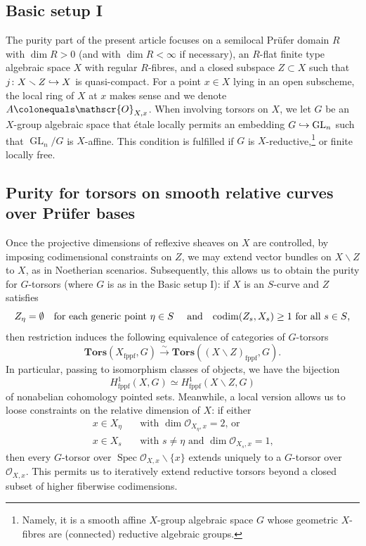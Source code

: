 \documentclass[JEP,XML,SOM,Unicode,published]{cedram}
\newcommand\hto{\mathrel{\lhook\joinrel\to}}
\let\backslash\smallsetminus
\newcommand{\sO}{\mathscr{O}}
\let\hra\hto
\let\ce\colonequals
\let\q\quad
\newcommand{\isoto}{\overset{\sim}{\longrightarrow}}
\newcommand{\fppf}{\mathrm{fppf}}
\DeclareMathOperator{\Spec}{Spec}
\DeclareMathOperator{\GL}{GL}
\DeclareMathOperator{\codim}{codim}
\theoremstyle{plain}
\theoremstyle{definition}
\begin{document}
\subsection{Basic setup I}\label{intro-setup}
The purity part of the present article focuses on a semilocal Prüfer domain $R$ with $\dim R>0$ (and with $\dim R<\infty$ if necessary), an $R$-flat finite type algebraic space $X$ with regular $R$-fibres, and a closed subspace $Z\subset X$ such that $j\colon X\backslash Z\hra X$ is quasi-compact.
For a point $x\in X$ lying in an open subscheme, the local ring of $X$ at $x$ makes sense and we denote $A\ce \sO_{X,x}$.
When involving torsors on $X$, we let $G$ be an $X$-group algebraic space that étale locally permits an embedding $G\hra \GL_n$ such that $\GL_n/G$ is $X$-affine.
This condition is fulfilled if $G$ is $X$-reductive,\footnote{Namely, it is a smooth affine $X$-group algebraic space $G$ whose geometric $X$-fibres are (connected) reductive algebraic groups.} or finite locally free.

\subsection{Purity for torsors on smooth relative curves over Prüfer bases}\label{par-Purity for torsors on smooth relative curves over Prüfer bases}
Once the projective dimensions of reflexive sheaves on $X$ are controlled, by imposing codimensional constraints on $Z$, we may extend vector bundles on $X\backslash Z$ to $X$, as in Noetherian scenarios.
Subsequently, this allows us to obtain the purity  for $G$-torsors {(where $G$ is as in the Basic setup I)}: if $X$ is an $S$-curve and $Z$ satisfies
\[
\text{$Z_{\eta}= \emptyset$\q for each generic point $\eta\in S$ \q and\q $\codim(Z_s,X_s)\ge 1$ for all $s\in S$,}
\]
then restriction induces the following equivalence of categories of $G$-torsors
\[
\mathbf{Tors}(X_{\fppf},G) \isoto \mathbf{Tors}((X\backslash Z)_{\fppf},G).
\]
In particular, passing to isomorphism classes of objects, we have the bijection
\[
H^1_{\fppf}(X,G)\simeq H^1_{\fppf}(X\backslash Z,G)
\]
of nonabelian cohomology pointed sets.
Meanwhile, a local version  allows us to loose constraints on the relative dimension of $X$: if either
\begin{align*}
x\in X_{\eta} & \quad \text{with $\dim \sO_{X_{\eta},x} =2$, or }\\
x\in X_s & \quad \text{with $s \neq \eta$ and $\dim \sO_{X_s,x} =1$,}
\end{align*}
then every $G$-torsor over $\Spec \sO_{X,x} \backslash \{x\}$ extends uniquely to a $G$-torsor over $ \sO_{X,x}$. This permits us to iteratively extend reductive torsors beyond a closed subset of higher fiberwise codimensions.
\end{document}
